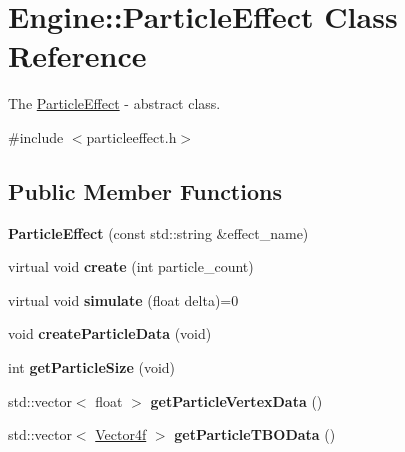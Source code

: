 \hypertarget{classEngine_1_1ParticleEffect}{}\section{Engine\+:\+:Particle\+Effect Class Reference}
\label{classEngine_1_1ParticleEffect}


The \hyperlink{classEngine_1_1ParticleEffect}{Particle\+Effect} -\/ abstract class.  




{\ttfamily \#include $<$particleeffect.\+h$>$}

\subsection*{Public Member Functions}
\begin{DoxyCompactItemize}
\item 
\hypertarget{classEngine_1_1ParticleEffect_aa55c9b01da59def9254a66fe802b0e9c}{}{\bfseries Particle\+Effect} (const std\+::string \&effect\+\_\+name)\label{classEngine_1_1ParticleEffect_aa55c9b01da59def9254a66fe802b0e9c}

\item 
\hypertarget{classEngine_1_1ParticleEffect_a63cbc0e15ade08c85b5988d04b5747aa}{}virtual void {\bfseries create} (int particle\+\_\+count)\label{classEngine_1_1ParticleEffect_a63cbc0e15ade08c85b5988d04b5747aa}

\item 
\hypertarget{classEngine_1_1ParticleEffect_aaef45570f2cd8d0968730c796464723e}{}virtual void {\bfseries simulate} (float delta)=0\label{classEngine_1_1ParticleEffect_aaef45570f2cd8d0968730c796464723e}

\item 
\hypertarget{classEngine_1_1ParticleEffect_a336fe1c2e155b31790141356e310338f}{}void {\bfseries create\+Particle\+Data} (void)\label{classEngine_1_1ParticleEffect_a336fe1c2e155b31790141356e310338f}

\item 
\hypertarget{classEngine_1_1ParticleEffect_a1f599788b9ee5cfd88e05ef3de16b298}{}int {\bfseries get\+Particle\+Size} (void)\label{classEngine_1_1ParticleEffect_a1f599788b9ee5cfd88e05ef3de16b298}

\item 
\hypertarget{classEngine_1_1ParticleEffect_a8e768de548d405cdbf45fba904c87a02}{}std\+::vector$<$ float $>$ {\bfseries get\+Particle\+Vertex\+Data} ()\label{classEngine_1_1ParticleEffect_a8e768de548d405cdbf45fba904c87a02}

\item 
\hypertarget{classEngine_1_1ParticleEffect_a89ceac8e16ec44ca1862c0d07531a5ec}{}std\+::vector$<$ \hyperlink{classVector4}{Vector4f} $>$ {\bfseries get\+Particle\+T\+B\+O\+Data} ()\label{classEngine_1_1ParticleEffect_a89ceac8e16ec44ca1862c0d07531a5ec}

\end{DoxyCompactItemize}
